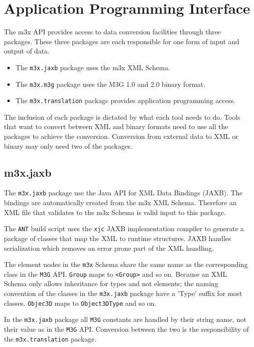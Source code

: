 \chapter{Application Programming Interface}
The m3x API provides access to data conversion facilities through three packages.
These three packages are each responsible for one form of input and output of data.
\begin{itemize}
\item The \texttt{m3x.jaxb} package uses the m3x XML Schema.
\item The \texttt{m3x.m3g} package uses the M3G 1.0 and 2.0 binary format.
\item The \texttt{m3x.translation} package provides application programming access.
\end{itemize}

The inclusion of each package is dictated by what each tool needs to do. Tools that want to convert between XML and binary formats need to use all the packages to achieve the conversion. Conversion from external data to XML or binary may only need two of the packages.


\section{m3x.jaxb}
The \texttt{m3x.jaxb} package use the Java API for XML Data Bindings (JAXB). The bindings are automatically created from the m3x XML Schema. Therefore an XML file that validates to the m3x Schema is valid input to this package.

The \texttt{ANT} build script uses the \texttt{xjc} JAXB implementation compiler to generate a package of classes that map the XML to runtime structures. JAXB handles serialization which removes an error prone part of the XML handling.

The element nodes in the \texttt{m3x} Schema share the same name as the corresponding class in the \texttt{M3G} API. \texttt{Group} maps to \texttt{<Group>} and so on.
Because an XML Schema only allows inheritance for types and not elements; the naming convention of the classes in the \texttt{m3x.jaxb} package have a 'Type' suffix for most classes. \texttt{Objec3D} maps to \texttt{Object3DType} and so on.

In the \texttt{m3x.jaxb} package all \texttt{M3G} constants are handled by their string name, not their value as in the \texttt{M3G} API. Conversion between the two is the responsibility of the \texttt{m3x.translation} package.

